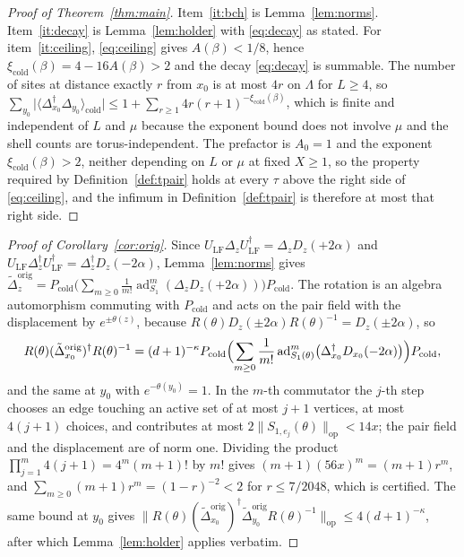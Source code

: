 \documentclass[11pt]{article}
\theoremstyle{plain}
\theoremstyle{definition}
\newcommand{\Dop}{\Delta}
\newcommand{\ad}{\operatorname{ad}}
\begin{document}
\begin{proof}[Proof of Theorem~\ref{thm:main}]
Item~\ref{it:bch} is Lemma~\ref{lem:norms}. Item~\ref{it:decay} is
Lemma~\ref{lem:holder} with \eqref{eq:decay} as stated. For
item~\ref{it:ceiling}, \eqref{eq:ceiling} gives $A(\beta)<1/8$, hence
$\xi_{\mathrm{cold}}(\beta)=4-16A(\beta)>2$ and the decay
\eqref{eq:decay} is summable. The number of sites at distance exactly $r$ from
$x_0$ is at most $4r$ on $\Lambda$ for $L\ge4$, so
$\sum_{y_0}\bigl|\langle\Dop^\dagger_{x_0}\Dop_{y_0}\rangle_{\mathrm{cold}}\bigr|
\le1+\sum_{r\ge1}4r(r+1)^{-\xi_{\mathrm{cold}}(\beta)}$, which is finite and
independent of $L$ and $\mu$ because the exponent bound does not involve $\mu$ and
the shell counts are torus-independent. The prefactor is $A_0=1$ and the exponent
$\xi_{\mathrm{cold}}(\beta)>2$, neither depending on $L$ or $\mu$ at fixed
$X\ge1$, so the property required by Definition~\ref{def:tpair} holds at every
$\tau$ above the right side of \eqref{eq:ceiling}, and the infimum in
Definition~\ref{def:tpair} is therefore at most that right side.
\end{proof}

\begin{proof}[Proof of Corollary~\ref{cor:orig}]
Since $U_{\mathrm{LF}}\Dop_zU_{\mathrm{LF}}^\dagger=\Dop_zD_z(+2\alpha)$ and
$U_{\mathrm{LF}}\Dop_z^\dagger U_{\mathrm{LF}}^\dagger=\Dop_z^\dagger D_z(-2\alpha)$,
Lemma~\ref{lem:norms} gives
$\tilde\Dop^{\mathrm{orig}}_z=P_{\mathrm{cold}}\bigl(\sum_{m\ge0}\frac1{m!}\ad_{S_1}^{m}
(\Dop_zD_z(+2\alpha))\bigr)P_{\mathrm{cold}}$. The rotation is an algebra
automorphism commuting with $P_{\mathrm{cold}}$ and acts on the pair field with
the displacement by $e^{\pm\theta(z)}$, because
$R(\theta)D_z(\pm2\alpha)R(\theta)^{-1}=D_z(\pm2\alpha)$, so
\begin{equation}\label{eq:corrot}
R(\theta)(\tilde\Dop^{\mathrm{orig}}_{x_0})^\dagger R(\theta)^{-1}
=(d+1)^{-\kappa}P_{\mathrm{cold}}\Bigl(\sum_{m\ge0}\frac1{m!}\ad_{S_1(\theta)}^{m}
\bigl(\Dop_{x_0}^\dagger D_{x_0}(-2\alpha)\bigr)\Bigr)P_{\mathrm{cold}} ,
\end{equation}
and the same at $y_0$ with $e^{-\theta(y_0)}=1$. In the $m$-th commutator the
$j$-th step chooses an edge touching an active set of at most $j+1$ vertices, at
most $4(j+1)$ choices, and contributes at most $2\|S_{1,e_j}(\theta)\|_{\mathrm{op}}<14x$;
the pair field and the displacement are of norm one. Dividing the product
$\prod_{j=1}^{m}4(j+1)=4^{m}(m+1)!$ by $m!$ gives $(m+1)(56x)^{m}=(m+1)r^{m}$, and
$\sum_{m\ge0}(m+1)r^{m}=(1-r)^{-2}<2$ for $r\le7/2048$, which is certified. The
same bound at $y_0$ gives
$\|R(\theta)(\tilde\Dop^{\mathrm{orig}}_{x_0})^\dagger\tilde\Dop^{\mathrm{orig}}_{y_0}R(\theta)^{-1}\|_{\mathrm{op}}
\le4(d+1)^{-\kappa}$, after which Lemma~\ref{lem:holder} applies verbatim.
\end{proof}
\end{document}
